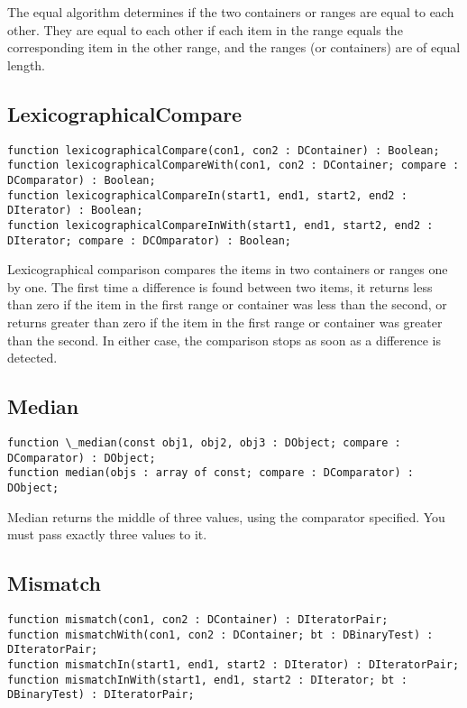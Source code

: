 \documentclass{report}
\begin{document}
The equal algorithm determines if the two containers or ranges are equal to
each other. They are equal to each other if each item in the range equals
the corresponding item in the other range, and the ranges (or containers)
are of equal length.

\subsection{LexicographicalCompare}

\begin{lstlisting}
function lexicographicalCompare(con1, con2 : DContainer) : Boolean;
function lexicographicalCompareWith(con1, con2 : DContainer; compare : DComparator) : Boolean;
function lexicographicalCompareIn(start1, end1, start2, end2 : DIterator) : Boolean;
function lexicographicalCompareInWith(start1, end1, start2, end2 : DIterator; compare : DCOmparator) : Boolean;
\end{lstlisting}

Lexicographical comparison compares the items in two containers or ranges
one by one.  The first time a difference is found between two items, it
returns less than zero if the item in the first range or container was less
than the second, or returns greater than zero if the item in the first range
or container was greater than the second.  In either case, the comparison
stops as soon as a difference is detected.

\subsection{Median}

\begin{lstlisting}
function \_median(const obj1, obj2, obj3 : DObject; compare : DComparator) : DObject;
function median(objs : array of const; compare : DComparator) : DObject;
\end{lstlisting}

Median returns the middle of three values, using the 
comparator specified. You must pass exactly three values to it.

\subsection{Mismatch}

\begin{lstlisting}
function mismatch(con1, con2 : DContainer) : DIteratorPair;
function mismatchWith(con1, con2 : DContainer; bt : DBinaryTest) : DIteratorPair;
function mismatchIn(start1, end1, start2 : DIterator) : DIteratorPair;
function mismatchInWith(start1, end1, start2 : DIterator; bt : DBinaryTest) : DIteratorPair; 
\end{lstlisting}
\end{document}
